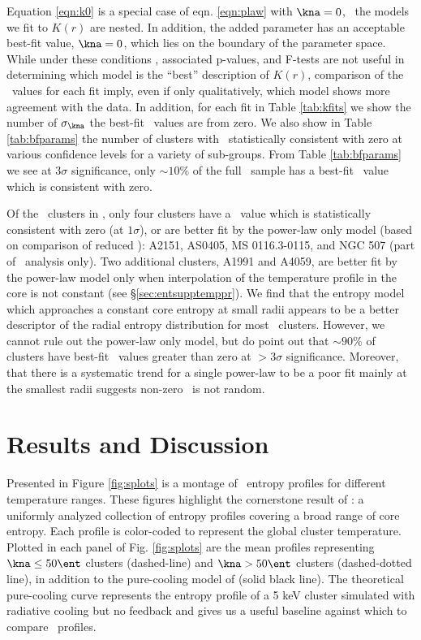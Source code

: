 Equation \ref{eqn:k0} is a special case of eqn. \ref{eqn:plaw} with
$\kna = 0$, \eg\ the models we fit to $K(r)$ are nested. In addition,
the added parameter has an acceptable best-fit value, $\kna = 0$,
which lies on the boundary of the parameter space. While under these
conditions \chisq, associated p-values, and F-tests are not useful in
determining which model is the ``best'' description of $K(r)$,
comparison of the \chisq\ values for each fit imply, even if only
qualitatively, which model shows more agreement with the data. In
addition, for each fit in Table \ref{tab:kfits} we show the number of
$\sigma_{\kna}$ the best-fit \kna\ values are from zero. We also show
in Table \ref{tab:bfparams} the number of clusters with \kna\
statistically consistent with zero at various confidence levels for a
variety of sub-groups. From Table \ref{tab:bfparams} we see at
$3\sigma$ significance, only $\sim10\%$ of the full \accept\ sample
has a best-fit \kna\ value which is consistent with zero.

Of the \entsuppnum\ clusters in \accept, only four clusters have a
\kna\ value which is statistically consistent with zero (at
$1\sigma$), or are better fit by the power-law only model (based on
comparison of reduced \chisq): A2151, AS0405, MS 0116.3-0115, and NGC
507 (part of \hifl\ analysis only). Two additional clusters, A1991 and
A4059, are better fit by the power-law model only when interpolation
of the temperature profile in the core is not constant (see
\S\ref{sec:entsupptemppr}). We find that the entropy model which approaches a
constant core entropy at small radii appears to be a better descriptor
of the radial entropy distribution for most \accept\
clusters. However, we cannot rule out the power-law only model, but do
point out that $\sim90\%$ of clusters have best-fit
\kna\ values greater than zero at $> 3\sigma$ significance. Moreover,
that there is a systematic trend for a single power-law to be a poor
fit mainly at the smallest radii suggests non-zero \kna\ is not
random.

\section{Results and Discussion}
\label{sec:entsuppr&d}

Presented in Figure \ref{fig:splots} is a montage of \accept\ entropy
profiles for different temperature ranges. These figures highlight the
cornerstone result of \accept: a uniformly analyzed collection of
entropy profiles covering a broad range of core entropy. Each profile
is color-coded to represent the global cluster temperature. Plotted in
each panel of Fig. \ref{fig:splots} are the mean profiles representing
$\kna \le 50 \ent$ clusters (dashed-line) and $\kna > 50 \ent$
clusters (dashed-dotted line), in addition to the pure-cooling model
of \citet{voitbryan} (solid black line). The theoretical pure-cooling
curve represents the entropy profile of a 5 keV cluster simulated with
radiative cooling but no feedback and gives us a useful baseline
against which to compare \accept\ profiles.

